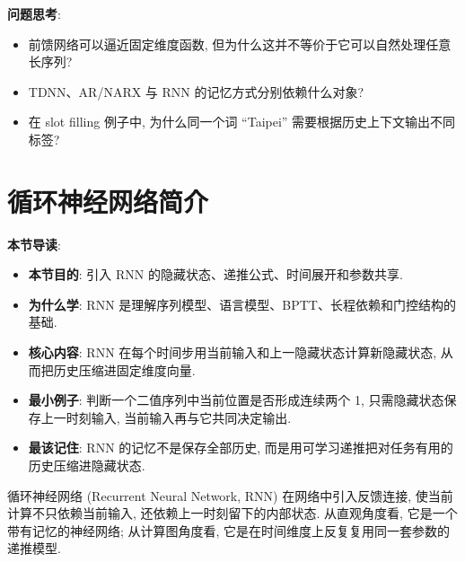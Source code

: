 \documentclass{../nndlcourse}
\begin{document}
\textbf{问题思考}:
\begin{itemize}
  \item 前馈网络可以逼近固定维度函数, 但为什么这并不等价于它可以自然处理任意长序列?
  \item TDNN、AR/NARX 与 RNN 的记忆方式分别依赖什么对象?
  \item 在 slot filling 例子中, 为什么同一个词 ``Taipei'' 需要根据历史上下文输出不同标签?
\end{itemize}

\section{循环神经网络简介}

\textbf{本节导读}:
\begin{itemize}
  \item \textbf{本节目的}: 引入 RNN 的隐藏状态、递推公式、时间展开和参数共享.
  \item \textbf{为什么学}: RNN 是理解序列模型、语言模型、BPTT、长程依赖和门控结构的基础.
  \item \textbf{核心内容}: RNN 在每个时间步用当前输入和上一隐藏状态计算新隐藏状态, 从而把历史压缩进固定维度向量.
  \item \textbf{最小例子}: 判断一个二值序列中当前位置是否形成连续两个 1, 只需隐藏状态保存上一时刻输入, 当前输入再与它共同决定输出.
  \item \textbf{最该记住}: RNN 的记忆不是保存全部历史, 而是用可学习递推把对任务有用的历史压缩进隐藏状态.
\end{itemize}

循环神经网络 (Recurrent Neural Network, RNN) 在网络中引入反馈连接, 使当前计算不只依赖当前输入, 还依赖上一时刻留下的内部状态. 从直观角度看, 它是一个带有记忆的神经网络; 从计算图角度看, 它是在时间维度上反复复用同一套参数的递推模型.
\end{document}

